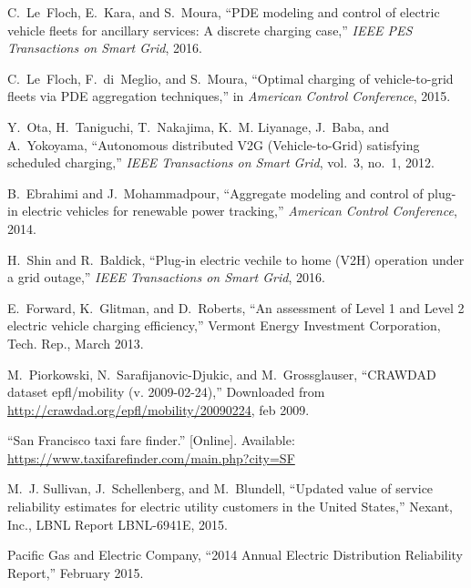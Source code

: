 \documentclass[conference]{IEEEtran}
\begin{document}
% 
% 
%
\begin{thebibliography}{10}

C.~Le~Floch, E.~Kara, and S.~Moura, ``{PDE} modeling and control of electric
  vehicle fleets for ancillary services: A discrete charging case,'' \emph{IEEE
  PES Transactions on Smart Grid}, 2016.

C.~Le~Floch, F.~di~Meglio, and S.~Moura, ``Optimal charging of vehicle-to-grid
  fleets via {PDE} aggregation techniques,'' in \emph{American Control
  Conference}, 2015.

Y.~Ota, H.~Taniguchi, T.~Nakajima, K.~M. Liyanage, J.~Baba, and A.~Yokoyama,
  ``Autonomous distributed {V2G} ({Vehicle-to-Grid}) satisfying scheduled
  charging,'' \emph{IEEE Transactions on Smart Grid}, vol.~3, no.~1, 2012.

B.~Ebrahimi and J.~Mohammadpour, ``Aggregate modeling and control of plug-in
  electric vehicles for renewable power tracking,'' \emph{American Control
  Conference}, 2014.

H.~Shin and R.~Baldick, ``Plug-in electric vechile to home ({V2H}) operation
  under a grid outage,'' \emph{IEEE Transactions on Smart Grid}, 2016.

E.~Forward, K.~Glitman, and D.~Roberts, ``An assessment of {Level} 1 and
  {Level} 2 electric vehicle charging efficiency,'' Vermont Energy Investment
  Corporation, Tech. Rep., March 2013.

M.~Piorkowski, N.~Sarafijanovic-Djukic, and M.~Grossglauser, ``{CRAWDAD}
  dataset epfl/mobility (v. 2009-02-24),'' Downloaded from
  \url{http://crawdad.org/epfl/mobility/20090224}, feb 2009.

\BIBentryALTinterwordspacing
``San {F}rancisco taxi fare finder.'' [Online]. Available:
  \url{https://www.taxifarefinder.com/main.php?city=SF}
\BIBentrySTDinterwordspacing

M.~J. Sullivan, J.~Schellenberg, and M.~Blundell, ``Updated value of service
  reliability estimates for electric utility customers in the {United}
  {States},'' Nexant, Inc., LBNL Report LBNL-6941E, 2015.

{Pacific Gas and Electric Company}, ``2014 {Annual} {Electric} {Distribution}
  {Reliability} {Report},'' February 2015.


\end{thebibliography}




\end{document}
